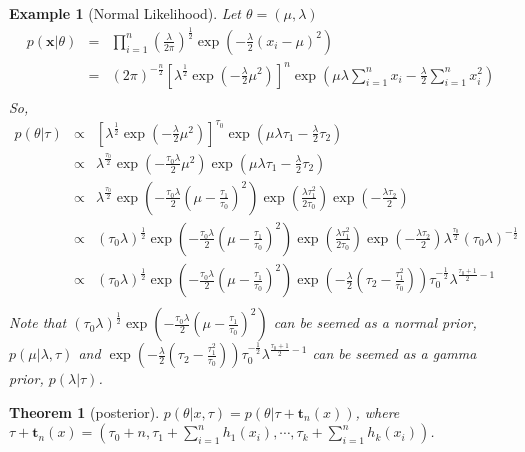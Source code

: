 \documentclass[11pt]{article}
\def\t{{\bm t}}
\def\x{{\bm x}}
\newtheorem{theorem}{Theorem}[section]
\newtheorem{example}{Example}[section]
\begin{document}
\begin{example}[Normal Likelihood]
Let $\theta = (\mu,\lambda)$
\begin{eqnarray*}
p(\x|\theta) &=& \prod_{i=1}^{n}\left(\frac{\lambda}{2\pi}\right)^{\frac{1}{2}}\exp\left(-\frac{\lambda}{2}(x_i-\mu)^2\right) \\
&=& (2\pi)^{-\frac{n}{2}}\left[\lambda^{\frac{1}{2}}\exp(-\frac{\lambda}{2}\mu^2)\right]^n\exp(\mu\lambda\sum_{i=1}^{n}x_i-\frac{\lambda}{2}\sum_{i=1}^{n}x_i^2)\\
\end{eqnarray*}
So, 
\begin{eqnarray*}
p(\theta|\tau) &\propto& \left[\lambda^{\frac{1}{2}}\exp(-\frac{\lambda}{2}\mu^2)\right]^{\tau_0}\exp(\mu\lambda\tau_1-\frac{\lambda}{2}\tau_2) \\
&\propto& \lambda^{\frac{\tau_0}{2}}\exp(-\frac{\tau_0\lambda}{2}\mu^2)\exp(\mu\lambda\tau_1-\frac{\lambda}{2}\tau_2) \\
&\propto& \lambda^{\frac{\tau_0}{2}}\exp\left(-\frac{\tau_0\lambda}{2}(\mu-\frac{\tau_1}{\tau_0})^2\right)\exp(\frac{\lambda\tau_1^2}{2\tau_0})\exp(-\frac{\lambda\tau_2}{2}) \\
&\propto& (\tau_0\lambda)^{\frac{1}{2}}\exp\left(-\frac{\tau_0\lambda}{2}(\mu-\frac{\tau_1}{\tau_0})^2\right)\exp(\frac{\lambda\tau_1^2}{2\tau_0})\exp(-\frac{\lambda\tau_2}{2})\lambda^{\frac{\tau_0}{2}}(\tau_0\lambda)^{-\frac{1}{2}} \\
&\propto& (\tau_0\lambda)^{\frac{1}{2}}\exp\left(-\frac{\tau_0\lambda}{2}(\mu-\frac{\tau_1}{\tau_0})^2\right)\exp(-\frac{\lambda}{2}(\tau_2-\frac{\tau_1^2}{\tau_0}))\tau_0^{-\frac{1}{2}}\lambda^{\frac{\tau_0+1}{2}-1}\\
\end{eqnarray*}
Note that $(\tau_0\lambda)^{\frac{1}{2}}\exp\left(-\frac{\tau_0\lambda}{2}(\mu-\frac{\tau_1}{\tau_0})^2\right)$ can be seemed as a normal prior, $p(\mu|\lambda,\tau)$ and $\exp(-\frac{\lambda}{2}(\tau_2-\frac{\tau_1^2}{\tau_0}))\tau_0^{-\frac{1}{2}}\lambda^{\frac{\tau_0+1}{2}-1}$ can be seemed as a gamma prior, $p(\lambda|\tau)$.
\end{example}
\begin{theorem}[posterior]
$p(\theta|x,\tau) = p(\theta|\tau+\t_n(x))$, where $\tau+\t_n(x) = (\tau_0+n, \tau_1+\sum_{i=1}^{n}h_1(x_i), \cdots, \tau_k+\sum_{i=1}^{n}h_k(x_i))$.
\end{theorem}
\end{document}
